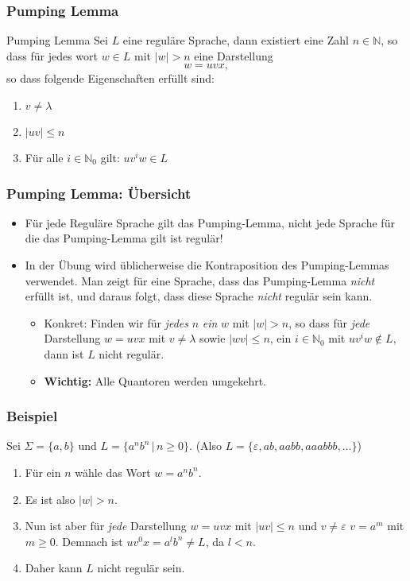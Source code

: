 \documentclass{beamer}
\begin{document}
\begin{frame}
\frametitle{Pumping Lemma}
\begin{exampleblock}{Pumping Lemma}
Sei $L$ eine reguläre Sprache, dann existiert eine Zahl $n \in \mathbb{N}$, so dass für jedes wort $w \in L$ mit $\left|w \right| > n$ eine Darstellung $$w = uvx,$$
so dass folgende Eigenschaften erfüllt sind:

\begin{enumerate}
\item $v \neq \lambda $ 
\item $\left|uv\right| \leq n$ 
\item Für alle $i \in \mathbb{N}_0$ gilt: $uv^iw \in L$
\end{enumerate}
\end{exampleblock}
\end{frame}
\begin{frame}
\frametitle{Pumping Lemma: Übersicht}
\begin{itemize}
\item Für jede Reguläre Sprache gilt das Pumping-Lemma, nicht jede Sprache für die das Pumping-Lemma gilt ist regulär!
\item In der Übung wird üblicherweise die Kontraposition des Pumping-Lemmas verwendet. Man zeigt für eine Sprache, dass das Pumping-Lemma \emph{nicht} erfüllt ist, und daraus folgt, dass diese Sprache \emph{nicht} regulär sein kann.
\begin{itemize}
\item Konkret: Finden wir für \emph{jedes} $n$ \emph{ein} $w$ mit $\left|w\right| > n$, so dass für \emph{jede} Darstellung $w = uvx$ mit $v \neq \lambda$ sowie $\left|wv\right| \leq n$, ein $i \in \mathbb{N}_0$ mit $uv^iw \notin L$, dann ist $L$ nicht regulär.
\item \textbf{Wichtig:} Alle Quantoren werden umgekehrt.
\end{itemize}
\end{itemize}
\end{frame}

\begin{frame}
\frametitle{Beispiel}
Sei $\Sigma = \{a, b\}$ und $L = \{a^nb^n\,|\,n\geq0\}$. (Also $L = \{\varepsilon,ab, aabb, aaabbb, \ldots\}$)
\begin{enumerate}
\item Für ein $n$ wähle das Wort $w = a^nb^n$.
\item Es ist also $\left|w\right| > n$.
\item Nun ist aber für \emph{jede} Darstellung $w = uvx$ mit $\left|uv\right| \leq n$ und $v \neq \varepsilon$ $v = a^m$ mit $m \geq 0$. Demnach ist $uv^0x = a^lb^n \neq L$, da $l < n$.
\item Daher kann $L$ nicht regulär sein.
\end{enumerate}

\end{frame}
\end{document}
